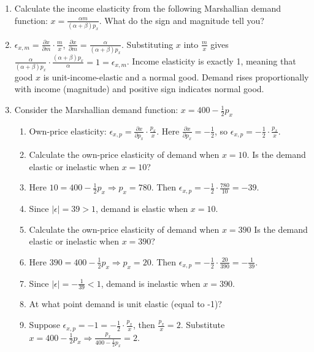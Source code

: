 \documentclass{article}
\begin{document}
\begin{enumerate}
\begin{enumerate}[label=(\alph*)]
\item[] $\mathcal{L}=U(x,y)+\lambda(m-p_xx+p_yy)$.
\item[] Thus, $\lambda^*=\frac{\partial v}{\partial m}=\frac{1}{m}$. $\lambda^*$ equals marginal utility of income ($1/m$) which is consistent with the log utility where extra amounts produce diminishing utilities as $m$ rises.
 \end{enumerate}
 \item Calculate the income elasticity from the following Marshallian demand function: $x = \frac{\alpha m}{(\alpha+\beta)p_x}$. What do the sign and magnitude tell you?
 \item[] $\epsilon_{x,m}=\frac{\partial x}{\partial m}\cdot\frac{m}{x}$, $\frac{\partial x}{\partial m}=\frac{\alpha}{(\alpha+\beta)p_x}$. Substituting $x$ into $\frac{m}{x}$ gives $\frac{\alpha}{(\alpha+\beta)p_x}\cdot\frac{(\alpha+\beta)p_x}{\alpha}=1=\epsilon_{x,m}$. Income elasticity is exactly 1, meaning that good $x$ is unit-income-elastic and a normal good. Demand rises proportionally with income (magnitude) and positive sign indicates normal good. 
\item Consider the Marshallian demand function: $x = 400 -\frac{1}{2}p_x$
\begin{enumerate}[label=(\alph*)]
\item[] Own-price elasticity: $\epsilon_{x,p}=\frac{\partial x}{\partial p_x}\cdot\frac{p_x}{x}$. Here $\frac{\partial x}{\partial p_x}=-\frac{1}{2}$, so $\epsilon_{x,p}=-\frac{1}{2}\cdot\frac{p_x}{x}$.
\item Calculate the own-price elasticity of demand when $x = 10$. Is the demand elastic or inelastic when $x = 10$?
\item[] Here $10=400-\frac{1}{2}p_x \Rightarrow p_x=780$. Then $\epsilon_{x,p}=-\frac{1}{2}\cdot\frac{780}{10}=-39$. 
\item[] Since $|\epsilon|=39 >1$, demand is elastic when $x=10$.
\item Calculate the own-price elasticity of demand when $x = 390$ Is the demand elastic or inelastic when $x = 390$?
\item[] Here $390=400-\frac{1}{2}p_x \Rightarrow p_x=20$. Then $\epsilon_{x,p}=-\frac{1}{2}\cdot\frac{20}{390}=-\frac{1}{39}$.
\item[] Since $|\epsilon|=-\frac{1}{39}<1$, demand is inelastic when $x=390$.
\item At what point demand is unit elastic (equal to -1)?
\item[] Suppose $\epsilon_{x,p}=-1=-\frac{1}{2}\cdot\frac{p_x}{x}$, then $\frac{p_x}{x}=2$. Substitute $x=400-\frac{1}{2}p_x \Rightarrow\frac{p_x}{400-\frac{1}{2}p_x}=2$. 

\end{enumerate}
\end{enumerate}
\end{document}
